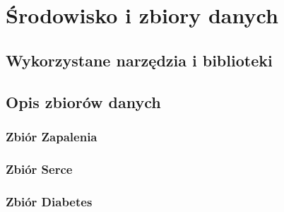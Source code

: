 \chapter{Środowisko i zbiory danych}

{%

\section{Wykorzystane narzędzia i biblioteki}
\section{Opis zbiorów danych}
\subsection{Zbiór Zapalenia}
\subsection{Zbiór Serce}
\subsection{Zbiór Diabetes}
}